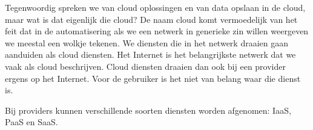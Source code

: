 Tegenwoordig spreken we van cloud oplossingen en van data opslaan in de cloud, maar wat is dat eigenlijk die cloud? De naam cloud komt vermoedelijk van het feit dat in de automatisering als we een netwerk in generieke zin willen weergeven we meestal een wolkje tekenen. We diensten die in het netwerk draaien gaan aanduiden als cloud diensten. Het Internet is het belangrijkste netwerk dat we vaak als cloud beschrijven. Cloud diensten draaien dan ook bij een provider ergens op het Internet. Voor de gebruiker is het niet van belang waar die dienst is.

Bij providers kunnen verschillende soorten diensten worden afgenomen: IaaS, PaaS en SaaS.
